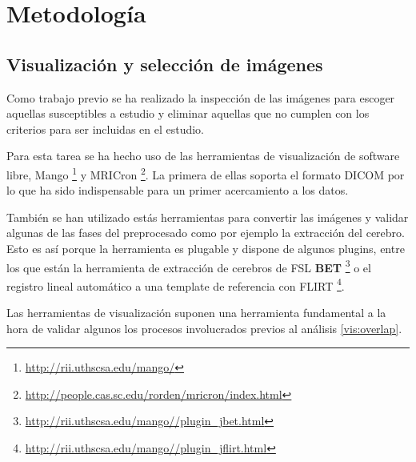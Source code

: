 \chapter{Metodología}

\section{Visualización y selección de imágenes}

Como trabajo previo se ha realizado la inspección de las imágenes para escoger aquellas susceptibles a estudio y eliminar aquellas que no cumplen con los criterios para ser incluidas en el estudio.

Para esta tarea se ha hecho uso de las herramientas de visualización de software libre, Mango \footnote{\url{http://rii.uthscsa.edu/mango/}} y MRICron \footnote{\url{http://people.cas.sc.edu/rorden/mricron/index.html}}. La primera de ellas soporta el formato DICOM por lo que ha sido indispensable para un primer acercamiento a los datos.

También se han utilizado estás herramientas para convertir las imágenes y validar algunas de las fases del preprocesado como por ejemplo la extracción del cerebro. Esto es así porque la herramienta es plugable y dispone de algunos plugins, entre los que están la herramienta de extracción de cerebros de FSL \textbf{BET} \footnote{\url{http://rii.uthscsa.edu/mango//plugin_jbet.html}} o el registro lineal automático a una template de referencia con FLIRT \footnote{\url{http://rii.uthscsa.edu/mango//plugin_jflirt.html}}.

Las herramientas de visualización suponen una herramienta fundamental a la hora de validar algunos los procesos involucrados previos al análisis \ref{vis:overlap}.

